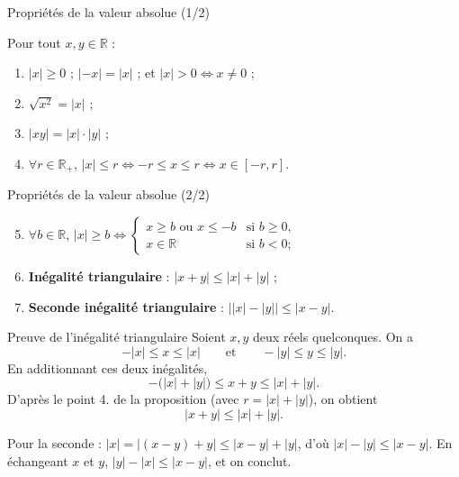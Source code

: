 \documentclass[aspectratio=169,11pt]{beamer}
\newcommand{\R}{\mathbb{R}}
\newcommand{\key}[1]{\textbf{\color{DarkBlue}#1}}
\begin{document}
\begin{frame}{Propriétés de la valeur absolue (1/2)}
	\begin{definitionbox}[Proposition 3.1]
		Pour tout $x,y\in\R$ :
		\begin{enumerate}
			\item $\lvert x\rvert\ge 0$ ; $\lvert -x\rvert=\lvert x\rvert$ ; et $\lvert x\rvert>0\iff x\neq 0$ ;
			\item $\sqrt{x^2}=\lvert x\rvert$ ;
			\item $\lvert xy\rvert=\lvert x\rvert\cdot\lvert y\rvert$ ;
			\item $\forall r\in\R_+$, $\lvert x\rvert\le r \iff -r\le x\le r \iff x\in[-r,r]$.
		\end{enumerate}
	\end{definitionbox}
\end{frame}

\begin{frame}{Propriétés de la valeur absolue (2/2)}
	\begin{definitionbox}
		\begin{enumerate}
			\setcounter{enumi}{4}
			\item $\forall b\in\R$,
			$\lvert x\rvert\ge b \iff
			\begin{cases}
				x\ge b\text{ ou }x\le -b & \text{si }b\ge 0,\\
				x\in\R & \text{si }b<0 ;
			\end{cases}$
			\item \key{Inégalité triangulaire} : $\lvert x+y\rvert\le\lvert x\rvert+\lvert y\rvert$ ;
			\item \key{Seconde inégalité triangulaire} :
			$\bigl\lvert \lvert x\rvert-\lvert y\rvert\bigr\rvert\le\lvert x-y\rvert$.
		\end{enumerate}
	\end{definitionbox}
\end{frame}

\begin{frame}{Preuve de l'inégalité triangulaire}
	Soient $x,y$ deux réels quelconques. On a
	\[
		-\lvert x\rvert\le x\le \lvert x\rvert
		\qquad\text{et}\qquad
		-\lvert y\rvert\le y\le \lvert y\rvert.
	\]
	En additionnant ces deux inégalités,
	\[
		-\bigl(\lvert x\rvert+\lvert y\rvert\bigr)
		\le x+y
		\le \lvert x\rvert+\lvert y\rvert.
	\]
	D'après le point 4. de la proposition (avec $r=\lvert x\rvert+\lvert y\rvert$), on obtient
	\[
		\lvert x+y\rvert\le \lvert x\rvert+\lvert y\rvert.
	\]
	\vspace{0.1cm}
	\begin{applicationbox}
		Pour la seconde : $\lvert x\rvert=\lvert (x-y)+y\rvert\le\lvert x-y\rvert+\lvert y\rvert$,
		d'où $\lvert x\rvert-\lvert y\rvert\le\lvert x-y\rvert$. En échangeant $x$ et $y$,
		$\lvert y\rvert-\lvert x\rvert\le\lvert x-y\rvert$, et on conclut.
	\end{applicationbox}
\end{frame}
\end{document}

